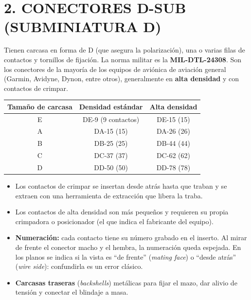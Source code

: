 \section*{2. CONECTORES D-SUB (SUBMINIATURA D)}

Tienen carcasa en forma de D (que asegura la polarización), una o varias filas de contactos y
tornillos de fijación. La norma militar es la \textbf{MIL-DTL-24308}. Son los conectores de la
mayoría de los equipos de aviónica de aviación general (Garmin, Avidyne, Dynon, entre otros),
generalmente en \textbf{alta densidad} y con contactos de crimpar.

\begin{center}
\small
\begin{tabular}{|c|c|c|}
\hline
\textbf{Tamaño de carcasa} & \textbf{Densidad estándar} & \textbf{Alta densidad} \\ \hline
E & DE-9 (9 contactos) & DE-15 (15) \\ \hline
A & DA-15 (15) & DA-26 (26) \\ \hline
B & DB-25 (25) & DB-44 (44) \\ \hline
C & DC-37 (37) & DC-62 (62) \\ \hline
D & DD-50 (50) & DD-78 (78) \\ \hline
\end{tabular}
\end{center}

\begin{itemize}
  \item Los contactos de crimpar se insertan desde atrás hasta que traban y se extraen con una
        herramienta de extracción que libera la traba.
  \item Los contactos de alta densidad son más pequeños y requieren su propia crimpadora o
        posicionador (el que indica el fabricante del equipo).
  \item \textbf{Numeración:} cada contacto tiene su número grabado en el inserto. Al mirar de frente
        el conector macho y el hembra, la numeración queda espejada. En los planos se indica si la
        vista es ``de frente'' (\textit{mating face}) o ``desde atrás'' (\textit{wire side}):
        confundirla es un error clásico.
  \item \textbf{Carcasas traseras} (\textit{backshells}) metálicas para fijar el mazo, dar alivio de
        tensión y conectar el blindaje a masa.
\end{itemize}


